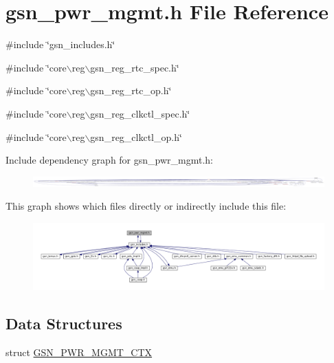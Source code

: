 \hypertarget{a00541}{
\section{gsn\_\-pwr\_\-mgmt.h File Reference}
\label{a00541}
}
{\ttfamily \#include \char`\"{}gsn\_\-includes.h\char`\"{}}\par
{\ttfamily \#include \char`\"{}core$\backslash$reg$\backslash$gsn\_\-reg\_\-rtc\_\-spec.h\char`\"{}}\par
{\ttfamily \#include \char`\"{}core$\backslash$reg$\backslash$gsn\_\-reg\_\-rtc\_\-op.h\char`\"{}}\par
{\ttfamily \#include \char`\"{}core$\backslash$reg$\backslash$gsn\_\-reg\_\-clkctl\_\-spec.h\char`\"{}}\par
{\ttfamily \#include \char`\"{}core$\backslash$reg$\backslash$gsn\_\-reg\_\-clkctl\_\-op.h\char`\"{}}\par
Include dependency graph for gsn\_\-pwr\_\-mgmt.h:
\nopagebreak
\begin{figure}[H]
\begin{center}
\leavevmode
\includegraphics[width=400pt]{a00779}
\end{center}
\end{figure}
This graph shows which files directly or indirectly include this file:
\nopagebreak
\begin{figure}[H]
\begin{center}
\leavevmode
\includegraphics[width=400pt]{a00780}
\end{center}
\end{figure}
\subsection*{Data Structures}
\begin{DoxyCompactItemize}
\item 
struct \hyperlink{a00184}{GSN\_\-PWR\_\-MGMT\_\-CTX}
\end{DoxyCompactItemize}
